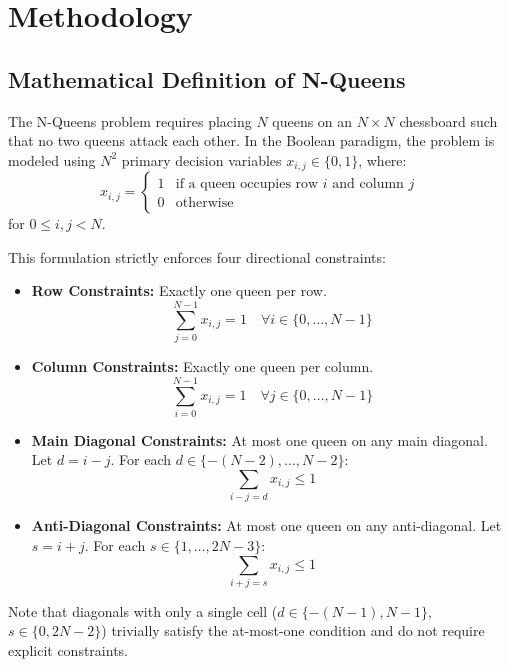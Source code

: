 \section{Methodology}
\label{sec:methodology}

\subsection{Mathematical Definition of N-Queens}
The N-Queens problem requires placing $N$ queens on an $N \times N$ chessboard such that no two queens attack each other. 
In the Boolean paradigm, the problem is modeled using $N^2$ primary decision variables $x_{i,j} \in \{0, 1\}$, where:
\begin{equation}
x_{i,j} =
\begin{cases}
1 & \text{if a queen occupies row } i \text{ and column } j\\
0 & \text{otherwise}
\end{cases}
\end{equation}
for $0 \le i, j < N$.

This formulation strictly enforces four directional constraints:
\begin{itemize}
\item \textbf{Row Constraints:} Exactly one queen per row.
\begin{equation}
\sum_{j=0}^{N-1}x_{i,j}=1 \quad \forall i \in \{0, \dots, N-1\}
\end{equation}
\item \textbf{Column Constraints:} Exactly one queen per column.
\begin{equation}
\sum_{i=0}^{N-1}x_{i,j}=1 \quad \forall j \in \{0, \dots, N-1\}
\end{equation}
\item \textbf{Main Diagonal Constraints:} At most one queen on any main diagonal. Let $d = i - j$. For each $d \in \{-(N-2), \dots, N-2\}$:
\begin{equation}
\sum_{i-j=d}x_{i,j}\le1
\end{equation}
\item \textbf{Anti-Diagonal Constraints:} At most one queen on any anti-diagonal. Let $s = i + j$. For each $s \in \{1, \dots, 2N-3\}$:
\begin{equation}
\sum_{i+j=s}x_{i,j}\le1
\end{equation}
\end{itemize}
Note that diagonals with only a single cell ($d \in \{-(N-1), N-1\}$, $s \in \{0, 2N-2\}$) trivially satisfy the at-most-one condition and do not require explicit constraints.

